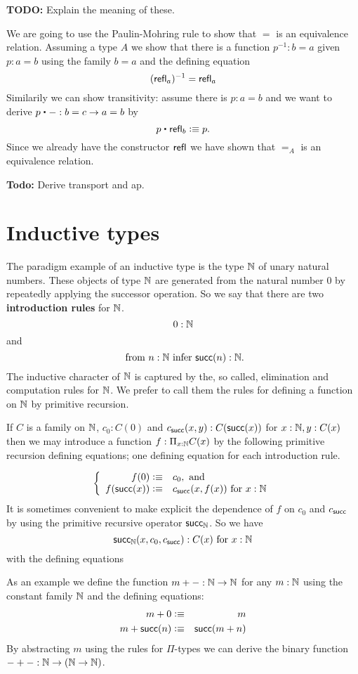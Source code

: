 \textbf{TODO:} Explain the meaning of these.

We are going to use the Paulin-Mohring rule to show that $=$ is an
equivalence relation. Assuming a type $A$ we show that there is a function
$p^{-1} : b = a$ given $p : a = b$ using the family $b = a$ and
the defining equation
\[ (\mathsf{refl}_{a})^{-1} = \mathsf{refl}_{a} \]
Similarily we can show transitivity: assume there is $p : a = b$ and
we want to derive $p \ct - : b = c \to a = b$ by
\[ p \ct \refl{b} \defeq p.\]
Since we already have the constructor $\mathsf{refl}_{}$ we have shown that $=_A$
is an equivalence relation. 


\textbf{Todo:} Derive transport and ap.

\section{Inductive types}
\label{sec:inductive-types}

The paradigm example of an inductive type is the type $\mathbb{N}$ of unary natural numbers.  These objects of type $\mathbb{N}$ are generated from the natural number $0$ by repeatedly applying the successor operation.  So we say that there are two {\bf introduction rules} for $\mathbb{N}$. 
  \[ 0:\mathbb{N}\]
and
  \[ \mbox{ from $n:\mathbb{N}$ infer $\mathsf{succ}(n):\mathbb{N}$}.\]
The inductive character of $\mathbb{N}$ is captured by the, so called, elimination and computation rules for $\mathbb{N}$.  We prefer to call them the rules for defining a function on $\mathbb{N}$ by primitive recursion. 

If $C$ is a family on $\mathbb{N}$, $c_0:C(0)$ and $c_{\mathsf{succ}}(x,y):C(\mathsf{succ}(x))$ for $x:\mathbb{N},y:C(x)$ then we may introduce a function $f:\Pi_{x:\mathbb{N}}C(x)$ by the following primitive recursion defining equations; one defining equation for each introduction rule.

  \[\left\{\begin{array}{rl}
f(0)\vcentcolon\equiv& c_0, \mbox{ and}\\
f(\mathsf{succ}(x))\vcentcolon\equiv& c_{\mathsf{succ}}(x,f(x))\mbox{ for } x:\mathbb{N}
  \end{array}\right.\]
It is sometimes convenient to make explicit the dependence of $f$ on $c_0$ and $c_{\mathsf{succ}}$ by using the primitive recursive operator $\mathsf{succ}_\mathbb{N}$.  So we have
  \[ \mathsf{succ}_\mathbb{N}(x,c_0,c_{\mathsf{succ}}):C(x)\mbox{ for } x:\mathbb{N}\]
with the defining equations


As an example we define the function $m + - : \mathbb{N} \to \mathbb{N}$ for any
$m : \mathbb{N}$ using the constant family $\mathbb{N}$ and the defining
equations:
\begin{eqnarray*}
  m + 0 & \vcentcolon\equiv & m \\
  m + \mathsf{succ}(n) & \vcentcolon\equiv & \mathsf{succ}(m + n)
\end{eqnarray*}
By abstracting $m$ using the rules for $\Pi$-types we can derive the
binary function $- + - : \mathbb{N} \to (\mathbb{N} \to \mathbb{N})$.

